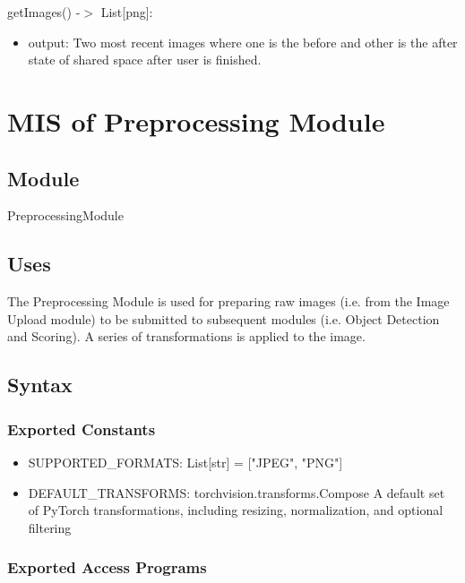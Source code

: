 \documentclass[12pt, titlepage]{article}
\begin{document}
\noindent getImages() -$>$ List[png]:
\begin{itemize}
\item output: Two most recent images where one is the before and other is the after state of shared space after user is finished.
\end{itemize}

\newpage


\section{MIS of Preprocessing Module} \label{Module} 

\subsection{Module}

PreprocessingModule

\subsection{Uses}
The Preprocessing Module is used for preparing raw images (i.e. from the Image Upload module) to be submitted to subsequent modules (i.e. Object Detection and Scoring). A series of transformations is applied to the image.

\subsection{Syntax}

\subsubsection{Exported Constants}

\begin{itemize}
  \item SUPPORTED{\_}FORMATS: List[str] = ["JPEG", "PNG"]
  \item DEFAULT{\_}TRANSFORMS: torchvision.transforms.Compose\: A default set of PyTorch transformations, including resizing, normalization, and optional filtering
\end{itemize}

\subsubsection{Exported Access Programs}
\end{document}
